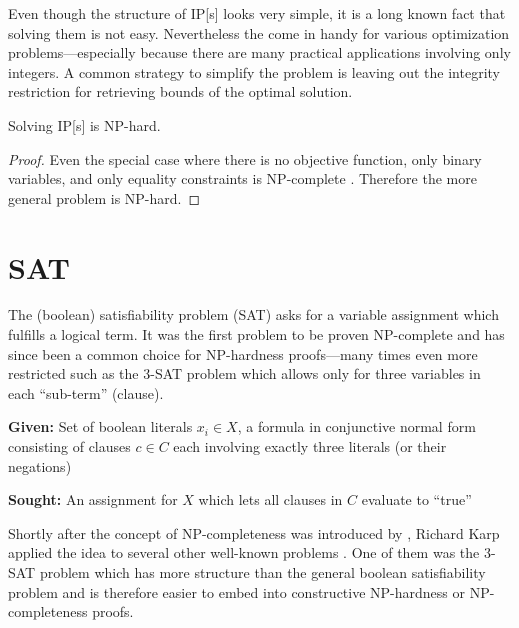 Even though the structure of \gls{IP}[s] looks very simple, it is a
long known fact that solving them is not easy. Nevertheless the come
in handy for various optimization problems---especially because there
are many practical applications involving only integers. A common
strategy to simplify the problem is leaving out the integrity
restriction for retrieving bounds of the optimal solution.

\begin{theorem}
  Solving \gls{IP}[s] is NP-hard.
\end{theorem}

\begin{proof}
  Even the special case where there is no objective function, only
  binary variables, and only equality constraints is NP-complete
  \cite{karp_np_complete}. Therefore the more general problem is
  NP-hard.
\end{proof}

\section{SAT}
The (boolean) satisfiability problem (SAT) asks for a variable
assignment which fulfills a logical term. It was the first problem to
be proven NP-complete \cite{np_complete} and has since been a common
choice for NP-hardness proofs---many times even more restricted such
as the 3-SAT problem which allows only for three variables in each
``sub-term'' (clause).

\begin{problem}[3-SAT]
  \label{prob:3SAT}\hfill
  \begin{labeling}{\hspace{4em}}
    \item[\textbf{Given:}]
      Set of boolean literals \(x_i \in X\), a formula in conjunctive 
      normal form consisting of clauses \(c \in C\) each involving 
      exactly three literals (or their negations)
    \item[\textbf{Sought:}]
      An assignment for \(X\) which lets all clauses in \(C\) evaluate
      to ``true''
  \end{labeling}
\end{problem}

Shortly after the concept of NP-completeness was introduced by 
\cite{np_complete}, Richard Karp applied the idea to several other
well-known problems \cite{karp_np_complete}. One of them was the
3-SAT problem which has more structure than the general boolean
satisfiability problem and is therefore easier to embed into
constructive NP-hardness or NP-completeness proofs.

